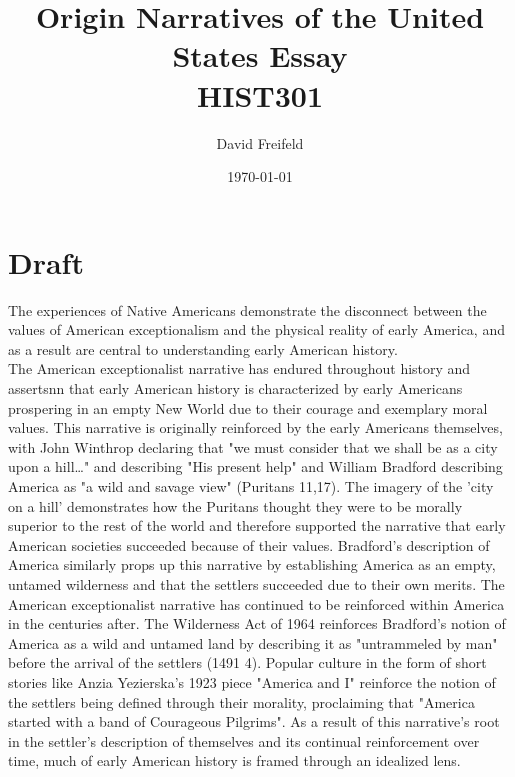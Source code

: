 \documentclass[letterpaper]{article}
\author{David Freifeld}
\date{\today}
\title{Origin Narratives of the United States Essay\\\medskip
\large HIST301}
\renewcommand{\tableofcontents}{}
\begin{document}
\tableofcontents


\section{Draft}
\label{sec:org538ea21}
The experiences of Native Americans demonstrate the disconnect between the values of American exceptionalism and the physical reality of early America, and as a result are central to understanding early American history.\\

The American exceptionalist narrative has endured throughout history and assertsnn that early American history is characterized by early Americans prospering in an empty New World due to their courage and exemplary moral values. This narrative is originally reinforced by the early Americans themselves, with John Winthrop declaring that "we must consider that we shall be as a city upon a hill\ldots{}" and describing "His present help" and William Bradford describing America as "a wild and savage view" (Puritans 11,17). The imagery of the 'city on a hill' demonstrates how the Puritans thought they were to be morally superior to the rest of the world and therefore supported the narrative that early American societies succeeded because of their values. Bradford's description of America similarly props up this narrative by establishing America as an empty, untamed wilderness and that the settlers succeeded due to their own merits. The American exceptionalist narrative has continued to be reinforced within America in the centuries after. The Wilderness Act of 1964 reinforces Bradford's notion of America as a wild and untamed land by describing it as "untrammeled by man" before the arrival of the settlers (1491 4). Popular culture in the form of short stories like Anzia Yezierska's 1923 piece "America and I" reinforce the notion of the settlers being defined through their morality, proclaiming that "America started with a band of Courageous Pilgrims". As a result of this narrative's root in the settler's description of themselves and its continual reinforcement over time, much of early American history is framed through an idealized lens.\\
\end{document}
